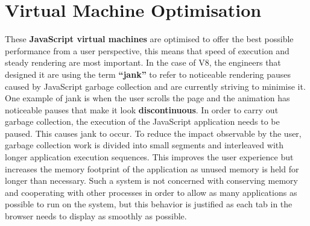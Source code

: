 \documentclass{l4proj}
\begin{document}
\section{Virtual Machine Optimisation}
\hspace*{3em} These \textbf{JavaScript virtual machines} are optimised to offer the best possible performance from a user perspective, this means that speed of execution and steady rendering are most important. In the case of V8, the engineers that designed it are using the term \textbf{``jank''} to refer to noticeable rendering pauses caused by JavaScript garbage collection and are currently striving to minimise it. One example of jank is when the user scrolls the page and the animation has noticeable pauses that make it look \textbf{discontinuous}. In order to carry out garbage collection, the execution of the JavaScript application needs to be paused. This causes jank to occur. To reduce the impact observable by the user, garbage collection work is divided into small segments and interleaved with longer application execution sequences. This improves the user experience but increases the memory footprint of the application as unused memory is held for longer than necessary. Such a system is not concerned with conserving memory and cooperating with other processes in order to allow as many applications as possible to run on the system, but this behavior is justified as each tab in the browser needs to display as smoothly as possible.
\\\\
\end{document}
